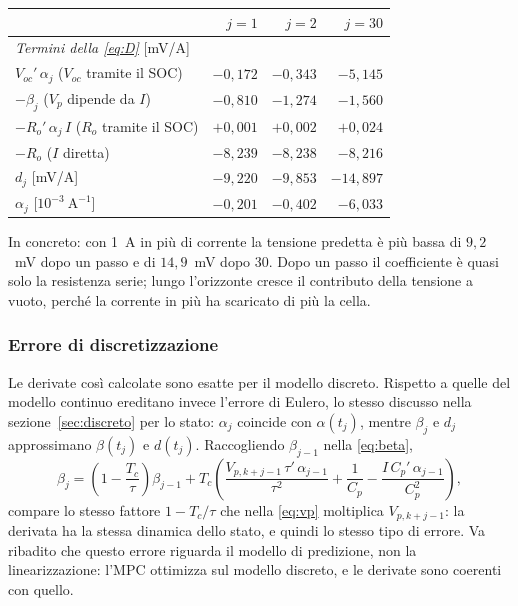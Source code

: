\documentclass[11pt,a4paper]{article}
\newcommand{\Tc}{T_c}
\begin{document}
\begin{center}
\begin{tabular}{lrrr}
\toprule
 & $j = 1$ & $j = 2$ & $j = 30$ \\
\midrule
\multicolumn{4}{l}{\emph{Termini della \eqref{eq:D}} [mV/A]} \\
$V_{oc}'\,\alpha_j$ \quad ($V_{oc}$ tramite il SOC) & $-0{,}172$ & $-0{,}343$ & $-5{,}145$ \\
$-\beta_j$ \quad ($V_p$ dipende da $I$) & $-0{,}810$ & $-1{,}274$ & $-1{,}560$ \\
$-R_o'\,\alpha_j\,I$ \quad ($R_o$ tramite il SOC) & $+0{,}001$ & $+0{,}002$ & $+0{,}024$ \\
$-R_o$ \quad ($I$ diretta) & $-8{,}239$ & $-8{,}238$ & $-8{,}216$ \\
\midrule
$d_j$ [mV/A] & $-9{,}220$ & $-9{,}853$ & $-14{,}897$ \\
$\alpha_j$ [$10^{-3}~\mathrm{A}^{-1}$] & $-0{,}201$ & $-0{,}402$ & $-6{,}033$ \\
\bottomrule
\end{tabular}
\end{center}

\noindent
In concreto: con 1~A in più di corrente la tensione predetta è più bassa di
$9{,}2$~mV dopo un passo e di $14{,}9$~mV dopo 30. Dopo un passo il coefficiente
è quasi solo la resistenza serie; lungo l'orizzonte cresce il contributo della
tensione a vuoto, perché la corrente in più ha scaricato di più la cella.

\subsubsection{Errore di discretizzazione}

Le derivate così calcolate sono esatte per il modello discreto. Rispetto a
quelle del modello continuo ereditano invece l'errore di Eulero, lo stesso
discusso nella sezione~\ref{sec:discreto} per lo stato: $\alpha_j$ coincide con
$\alpha(t_j)$, mentre $\beta_j$ e $d_j$ approssimano $\beta(t_j)$ e $d(t_j)$.
Raccogliendo $\beta_{j-1}$ nella \eqref{eq:beta},
\[
  \beta_j = \left(1 - \frac{\Tc}{\tau}\right)\beta_{j-1}
            + \Tc\left(\frac{V_{p,k+j-1}\,\tau'\,\alpha_{j-1}}{\tau^2}
            + \frac{1}{C_p} - \frac{I\,C_p'\,\alpha_{j-1}}{C_p^2}\right) ,
\]
compare lo stesso fattore $1 - \Tc/\tau$ che nella \eqref{eq:vp} moltiplica
$V_{p,k+j-1}$: la derivata ha la stessa dinamica dello stato, e quindi lo
stesso tipo di errore. Va ribadito che questo errore riguarda il modello di
predizione, non la linearizzazione: l'MPC ottimizza sul modello discreto, e le
derivate sono coerenti con quello.
\end{document}
